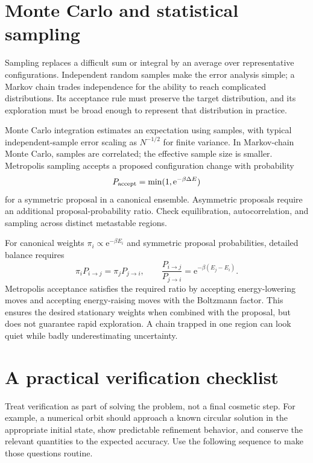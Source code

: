 \documentclass[11pt,oneside]{book}
\newcommand{\ee}{\mathrm{e}}
\theoremstyle{reviewstyle}
\begin{document}
\section{Monte Carlo and statistical sampling}
Sampling replaces a difficult sum or integral by an average over representative configurations. Independent random samples make the error analysis simple; a Markov chain trades independence for the ability to reach complicated distributions. Its acceptance rule must preserve the target distribution, and its exploration must be broad enough to represent that distribution in practice.

Monte Carlo integration estimates an expectation using samples, with typical independent-sample error scaling as $N^{-1/2}$ for finite variance. In Markov-chain Monte Carlo, samples are correlated; the effective sample size is smaller. Metropolis sampling accepts a proposed configuration change with probability
\begin{equation}P_{\rm accept}=\min(1,\ee^{-\beta\Delta E})\end{equation}
for a symmetric proposal in a canonical ensemble. Asymmetric proposals require an additional proposal-probability ratio. Check equilibration, autocorrelation, and sampling across distinct metastable regions.

For canonical weights $\pi_i\propto\ee^{-\beta E_i}$ and symmetric proposal probabilities, detailed balance requires
\begin{equation}
\pi_iP_{i\to j}=\pi_jP_{j\to i},\qquad
\frac{P_{i\to j}}{P_{j\to i}}=\ee^{-\beta(E_j-E_i)}.
\end{equation}
Metropolis acceptance satisfies the required ratio by accepting energy-lowering moves and accepting energy-raising moves with the Boltzmann factor. This ensures the desired stationary weights when combined with the proposal, but does not guarantee rapid exploration. A chain trapped in one region can look quiet while badly underestimating uncertainty.

\section{A practical verification checklist}
Treat verification as part of solving the problem, not a final cosmetic step. For example, a numerical orbit should approach a known circular solution in the appropriate initial state, show predictable refinement behavior, and conserve the relevant quantities to the expected accuracy. Use the following sequence to make those questions routine.
\end{document}
